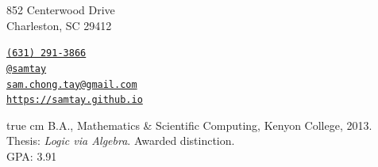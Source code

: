 \documentclass[11pt,article,oneside]{memoir}
\makeatletter
\def\myemail{sam.chong.tay@gmail.com}
\def\myweb{https://samtay.github.io}
\def\myphone{(631) 291-3866}
\def\mygithub{@samtay}
\makeatother
\begin{document}
\renewcommand{\labelitemi}{~}

\def\ind{\hangindent=1 true cm\hangafter=1 \noindent}
\def\labelitemi{~}
\renewcommand{\labelitemii}{~}


\pagestyle{kjh}


\hfill
\begin{minipage}[t]{2.95in}
  \vspace{0.34in}
  \flushright
    {\footnotesize 852 Centerwood Drive \\ \vspace{-0.05in} Charleston, \textsc{SC} 29412}
\end{minipage}
\hfill
\begin{minipage}[t]{1.6in}
  \flushright
    {\footnotesize  \texttt{\href{tel:\myphone}{\myphone}} \, \faPhone} \\
    {\footnotesize  \texttt{\href{https://github.com/samtay}{\mygithub}} \, \faGithub}  \\
    {\footnotesize  \texttt{\href{mailto:\myemail}{\myemail}} \, \faEnvelope} \\
    {\footnotesize  \texttt{\href{\myweb}{\myweb}} \, \faGlobe}
\end{minipage}


\vspace{-1em} %
{}
\reversemarginpar

\bigskip
\medskip


\ind B.A., Mathematics \& Scientific Computing, Kenyon College, 2013. \\
\footnotesize
  Thesis: \emph{Logic via Algebra}. Awarded distinction. \\
  GPA: 3.91
\normalsize
\vspace{0.05in}
\end{document}

